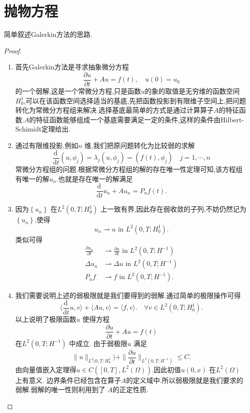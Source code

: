 \section{抛物方程}
\begin{exercise}
  简单叙述Galerkin方法的思路.
\end{exercise}
\begin{proof}
\begin{enumerate}
  \item 首先Galerkin方法是寻求抽象微分方程
  \[
    \frac{\partial u}{\partial t} +Au=f(t),\quad u(0)=u_0
  \] 
  的一个弱解,这是一个常微分方程,只是函数$u$的象的取值是无穷维的函数空间$H^{1}_0$,可以在该函数空间选择适当的基底,先把函数投影到有限维子空间上,把问题转化为常微分方程组来解决.选择基底最简单的方式是通过计算算子$A$的特征函数.$A$的特征函数能够组成一个基底需要满足一定的条件,这样的条件由Hilbert-Schimidt定理给出.
  \item 通过有限维投影,例如$n$ 维,我们把原问题转化为比较弱的求解
    \[
      \frac{\mathrm{d}\,}{\mathrm{d}t}(u,\phi_j)=\lambda_j(u,\phi_j)=(f(t),\phi_j)\quad j=1,\cdots,n
    \] 
    常微分方程组的问题.根据常微分方程组的解的存在唯一性定理可知,该方程组有唯一的解$u_n$.也就是存在唯一的解满足
    \[
      \frac{\mathrm{d}\,}{\mathrm{d}t}u_n+A u_n=P_n f(t).
    \] 
  \item 因为$\left\{u_n\right\} $ 在$L^2(0,T;H_0^{1})$ 上一致有界,因此存在弱收敛的子列,不妨仍然记为$\left\{u_n\right\} $,使得
    \[
      u_n \rightharpoonup u \text{ in } L^2(0,T;H^{1}_0).
    \] 
    类似可得
    \begin{equation*}
      \begin{aligned}
	\frac{\partial u_n}{\partial t} & \rightharpoonup \frac{\partial u}{\partial t}  \text{ in }L^2(0,T;H^{-1})\\
	\Delta u_n & \rightharpoonup \Delta u \text{ in }L^2(0,T;H^{-1})\\
	P_nf & \rightharpoonup f \text{ in }L^2(0,T;H^{-1}).
      \end{aligned}
    \end{equation*}
  \item 我们需要说明上述的弱极限就是我们要得到的弱解.通过简单的极限操作可得
    \[
      \langle \frac{\mathrm{d}\,}{\mathrm{d}t}u,v\rangle+\langle Au,v\rangle=\langle f,v\rangle.\quad \forall v \in L^2(0,T;H_0^{1}).
    \] 
    以上说明了极限函数$u$ 使得方程
    \[
      \frac{\partial u}{\partial t} +Au=f(t)
    \] 
    在$L^2(0,T;H^{-1})$ 中成立.
    由于弱极限$u$ 满足
    \[
      \|u\|_{L^2(0,T;H^{1}_0})+\|\frac{\partial u}{\partial t} \|_{L^2(0,T;H^{-1})}\le C.
    \] 
    由向量值嵌入定理得$u\in C([0,T],L^2(\Omega))$.因此初值$u(0,x)$ 在$L^2(\Omega)$ 上有意义. 边界条件已经包含在算子$A$的定义域中.所以弱极限就是我们要求的弱解.弱解的唯一性则利用到了 $A$的正定性质.

\end{enumerate}
\end{proof}
